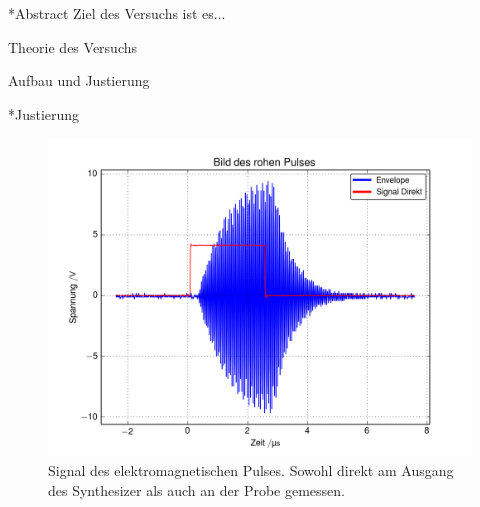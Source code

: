 \documentclass[pdftex, a4paper,11pt, twoside, ngerman]{report}
\begin{document}
  
  
  
  
  
  
  
  
  \begin{chapter}*{Abstract}
    Ziel des Versuchs ist es...
    
    
  \end{chapter}
  
  \tableofcontents
  
  
  
  \begin{chapter}{Theorie des Versuchs}
    \label{chp:Theorie}
    
    
    
  \end{chapter}
  
  
  \newpage
  \begin{chapter}{Aufbau und Justierung}
    \label{chpAufbau}
    
    
    
    \begin{section}*{Justierung}
      \label{chpAufbauJustierung}
      
      \begin{figure}[htb]
        \centering
        \includegraphics[width=\textwidth]{Figures/RohPuls1.png}
        \caption{Signal des elektromagnetischen Pulses.
          Sowohl direkt am Ausgang des Synthesizer als auch an der Probe
          gemessen.}
        \label{figRohPuls}
      \end{figure}

      
    \end{section}
    
  \end{chapter}
  
\end{document}
